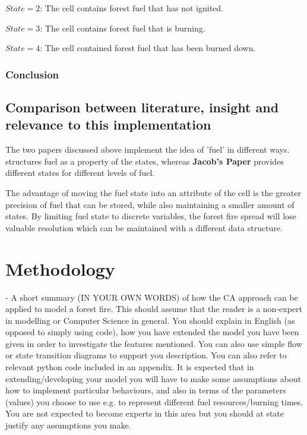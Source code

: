 \documentclass[11pt, a4paper, titlepage]{article}
\begin{document}
  $State = 2$: The cell contains forest fuel that has not ignited.
  
  $State = 3$: The cell contains forest fuel that is burning.
  
  $State = 4$: The cell contained forest fuel that has been burned down.
  
  
  \subsubsection{Conclusion}

  \subsection{Comparison between literature, insight and relevance to this implementation}
  The two papers discussed above implement the idea of 'fuel' in different ways. \cite{ALEXANDRIDIS2008191} structures fuel as a property of the states, whereas \textbf{Jacob's Paper} provides different states for different levels of fuel. 
  
  The advantage of moving the fuel state into an attribute of the cell is the greater precision of fuel that can be stored, while also maintaining a smaller amount of states. By limiting fuel state to discrete variables, the forest fire spread will lose valuable resolution which can be maintained with a different data structure.

\section{Methodology}
\begin{displayquote}
  - A short summary (IN YOUR OWN WORDS) of how the CA approach can
  be applied to model a forest fire. This should assume that the reader is a non-expert in modelling or
  Computer Science in general. You should explain in English (as opposed to simply using code), how
  you have extended the model you have been given in order to investigate the features mentioned.
  You can also use simple flow or state transition diagrams to support you description. You can also
  refer to relevant python code included in an appendix.
  It is expected that in extending/developing your model you will have to make some assumptions
  about how to implement particular behaviours, and also in terms of the parameters (values) you
  choose to use e.g. to represent different fuel resources/burning times. You are not expected to
  become experts in this area but you should at state justify any assumptions you make.
\end{displayquote} 
\end{document}
